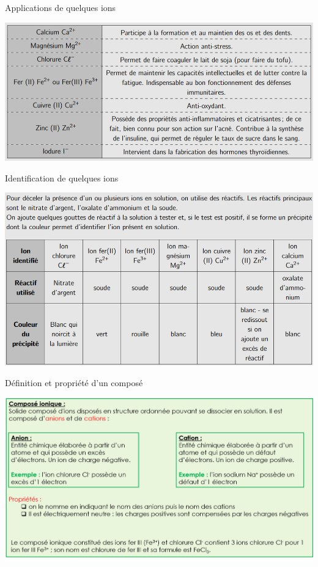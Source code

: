 \begin{doc}{Applications de quelques ions}
\vspace{-0.8cm}
\begin{center}
    \includegraphics[scale=0.73]{Images/Ions.png}
\end{center}
\end{doc}

\begin{doc}{Identification de quelques ions}
\vspace{-0.8cm}
\begin{center}
    \includegraphics[scale=1]{Images/Ions_identification.png}
\end{center}
\end{doc}
\newpage
\begin{doc}{Définition et propriété d'un composé}
\vspace{-1cm}
\begin{center}
    \includegraphics[scale=0.55]{Images/Solide_ionique.png}
\end{center}
\end{doc}

